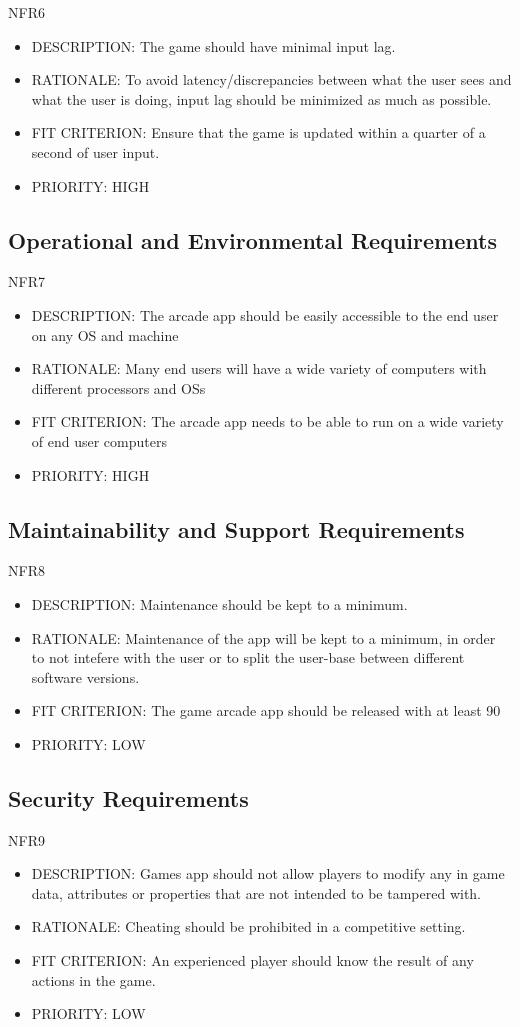 \documentclass[12pt, titlepage]{article}
\begin{document}
NFR6
\begin{itemize}
    \item DESCRIPTION: The game should have minimal input lag.
    \item RATIONALE: To avoid latency/discrepancies between what the user sees and what the user is doing,
input lag should be minimized as much as possible.
    \item FIT CRITERION: Ensure that the game is updated within a quarter of a second of user input.
    \item PRIORITY: HIGH
\end{itemize}

\subsection{Operational and Environmental Requirements}
NFR7
\begin{itemize}
    \item DESCRIPTION: The arcade app should be easily accessible to the end user on any OS and machine
    \item RATIONALE: Many end users will have a wide variety of computers with different processors and OSs
    \item FIT CRITERION: The arcade app needs to be able to run on a wide variety of end user
computers
    \item PRIORITY: HIGH
\end{itemize}

\subsection{Maintainability and Support Requirements}
NFR8
\begin{itemize}
    \item DESCRIPTION:  Maintenance should be kept to a minimum.
    \item RATIONALE: Maintenance of the app will be kept to a minimum, in order to not
intefere with the user or to split the user-base between different software versions.
    \item FIT CRITERION: The game arcade app should be released with at least 90%
    \item PRIORITY: LOW
\end{itemize}

\subsection{Security Requirements}
NFR9
\begin{itemize}
    \item DESCRIPTION: Games app should not allow players to modify any in game data, attributes or properties 
that are not intended to be tampered with.
    \item RATIONALE:  Cheating should be prohibited in a competitive setting.
    \item FIT CRITERION: An experienced player should know the result of any actions in the game.
    \item PRIORITY: LOW
\end{itemize}
\end{document}
